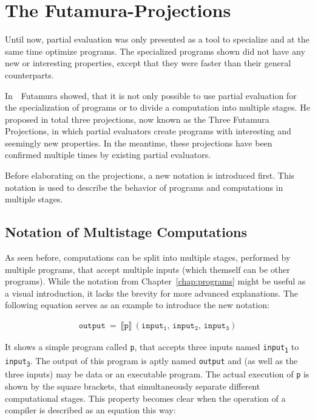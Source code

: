 
\section{The Futamura-Projections}\label{sec:futamura}

Until now, partial evaluation was only presented as a tool to specialize and at the same time optimize programs.
The specialized programs shown did not have any new or interesting properties, except that they were faster than their general counterparts.

In~\cite{Futamura_PECompilerCompiler}~Futamura showed, that it is not only possible to use partial evaluation for the specialization of programs or to divide a computation into multiple stages.
He proposed in total three projections, now known as the Three Futamura Projections, in which partial evaluators create programs with interesting and seemingly new properties.
In the meantime, these projections have been confirmed multiple times by existing partial evaluators.

Before elaborating on the projections, a new notation is introduced first.
This notation is used to describe the behavior of programs and computations in multiple stages.


\subsection{Notation of Multistage Computations}\label{sec:multistage-notation}

As seen before, computations can be split into multiple stages, performed by multiple programs, that accept multiple inputs (which themself can be other programs).
While the notation from Chapter~\ref{chap:programs} might be useful as a visual introduction, it lacks the brevity for more advanced explanations.
The following equation serves as an example to introduce the new notation:

\begin{align}
  \mathtt{output}\ =\
  \llbracket \mathtt{p} \rrbracket\ (\mathtt{input_1},\, \mathtt{input_2},\, \mathtt{input_3})
\end{align}

It shows a simple program called \texttt{p}, that accepts three inputs named \texttt{input\textsubscript{1}} to \texttt{input\textsubscript{3}}.
The output of this program is aptly named \texttt{output} and (as well as the three inputs) may be data or an executable program.
The actual execution of \texttt{p} is shown by the square brackets, that simultaneously separate different computational stages.
This property becomes clear when the operation of a compiler is described as an equation this way:

